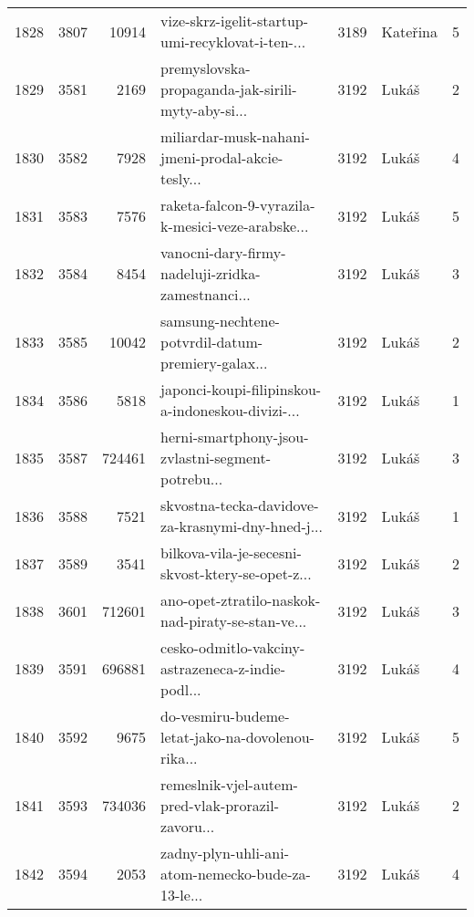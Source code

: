 \begin{tabular}{lrrlrlr}
1828 &       3807 &    10914 &  vize-skrz-igelit-startup-umi-recyklovat-i-ten-... &     3189 &                     Kateřina &               5 \\
1829 &       3581 &     2169 &  premyslovska-propaganda-jak-sirili-myty-aby-si... &     3192 &                        Lukáš &               2 \\
1830 &       3582 &     7928 &  miliardar-musk-nahani-jmeni-prodal-akcie-tesly... &     3192 &                        Lukáš &               4 \\
1831 &       3583 &     7576 &  raketa-falcon-9-vyrazila-k-mesici-veze-arabske... &     3192 &                        Lukáš &               5 \\
1832 &       3584 &     8454 &  vanocni-dary-firmy-nadeluji-zridka-zamestnanci... &     3192 &                        Lukáš &               3 \\
1833 &       3585 &    10042 &  samsung-nechtene-potvrdil-datum-premiery-galax... &     3192 &                        Lukáš &               2 \\
1834 &       3586 &     5818 &  japonci-koupi-filipinskou-a-indoneskou-divizi-... &     3192 &                        Lukáš &               1 \\
1835 &       3587 &   724461 &  herni-smartphony-jsou-zvlastni-segment-potrebu... &     3192 &                        Lukáš &               3 \\
1836 &       3588 &     7521 &  skvostna-tecka-davidove-za-krasnymi-dny-hned-j... &     3192 &                        Lukáš &               1 \\
1837 &       3589 &     3541 &  bilkova-vila-je-secesni-skvost-ktery-se-opet-z... &     3192 &                        Lukáš &               2 \\
1838 &       3601 &   712601 &  ano-opet-ztratilo-naskok-nad-piraty-se-stan-ve... &     3192 &                        Lukáš &               3 \\
1839 &       3591 &   696881 &  cesko-odmitlo-vakciny-astrazeneca-z-indie-podl... &     3192 &                        Lukáš &               4 \\
1840 &       3592 &     9675 &  do-vesmiru-budeme-letat-jako-na-dovolenou-rika... &     3192 &                        Lukáš &               5 \\
1841 &       3593 &   734036 &  remeslnik-vjel-autem-pred-vlak-prorazil-zavoru... &     3192 &                        Lukáš &               2 \\
1842 &       3594 &     2053 &  zadny-plyn-uhli-ani-atom-nemecko-bude-za-13-le... &     3192 &                        Lukáš &               4 \\

\end{tabular}
